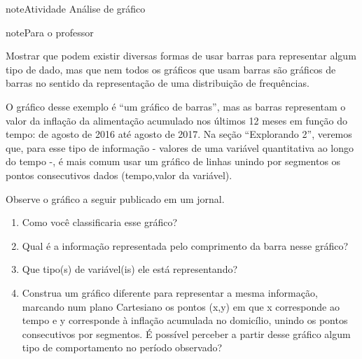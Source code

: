 \begin{sphinxadmonition}{note}{Atividade}{ Análise de gráfico}

\begin{sphinxadmonition}{note}{Para o professor}

 Mostrar que podem existir diversas formas de usar barras para representar algum tipo de dado, mas que nem todos os gráficos que usam barras são gráficos de barras no sentido da representação de uma distribuição de frequências.

 O gráfico desse exemplo é ``um gráfico de barras'', mas as barras representam o valor da inflação da alimentação acumulado nos últimos 12 meses em função do tempo: de agosto de 2016 até agosto de 2017. Na seção ``Explorando 2'', veremos que, para esse tipo de informação - valores de uma variável quantitativa ao longo do tempo -, é mais comum usar um gráfico de linhas unindo por segmentos os pontos consecutivos dados (tempo,valor da variável).
\end{sphinxadmonition}

Observe o gráfico a seguir publicado em um jornal.
\begin{enumerate}
\item {} 
Como você classificaria esse gráfico?

\item {} 
Qual é a informação representada pelo comprimento da barra nesse gráfico?

\item {} 
Que tipo(s) de variável(is) ele está representando?

\item {} 
Construa um gráfico diferente para representar a mesma informação, marcando num plano Cartesiano os pontos (x,y) em que x corresponde ao tempo e y corresponde à inflação acumulada no domicílio, unindo os pontos consecutivos por segmentos. É possível perceber a partir desse gráfico algum tipo de comportamento no período observado?


\end{enumerate}
\end{sphinxadmonition}

